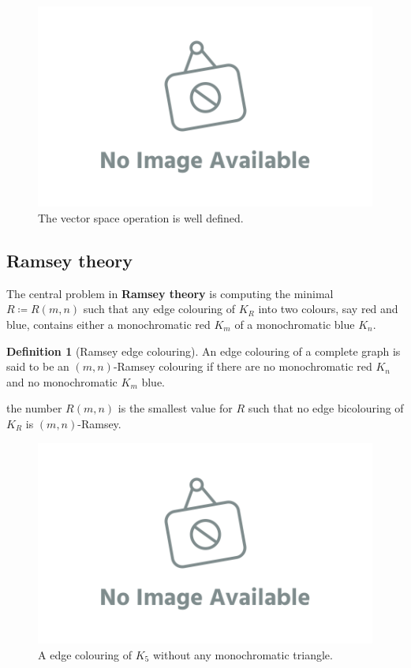 \documentclass[12pt]{amsart}
\theoremstyle{definition}
\newtheorem{defin}[thm]{Definition}
\begin{document}
\begin{figure}[h]
\includegraphics[scale=.1]{../imgs/ina.png}%
\caption{The vector space operation is well defined.\label{fig:consistency_squares}}
\end{figure}


\subsection{Ramsey theory}
The central problem in \textbf{Ramsey theory} is computing the minimal $R \coloneqq R(m, n)$ such that any edge colouring of $K_R$ into two colours, say red and blue, contains either a monochromatic red $K_m$ of a monochromatic blue $K_n$.

\begin{defin}[Ramsey edge colouring]
An edge colouring of a complete graph is said to be an $(m, n)$-Ramsey colouring if there are no monochromatic red $K_n$ and no monochromatic $K_m$ blue.

the number $R(m, n)$ is the smallest value for $R$ such that no edge bicolouring of $K_R$ is $(m, n)$-Ramsey.
\end{defin}


\begin{figure}[h]
\includegraphics[scale=.1]{../imgs/ina.png}%
\caption{A edge colouring of $K_5$ without any monochromatic triangle.\label{fig:k5_bicolour}}
\end{figure}
\end{document}
